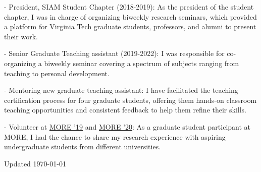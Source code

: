 \documentclass[11pt,letterpaper]{report}
\begin{document}
   \begin{tablist}
    \item[-] President, SIAM Student Chapter (2018-2019): As the president of the student chapter, I was in charge of organizing  biweekly
    research seminars, which provided a platform for Virginia Tech graduate students, professors, and alumni to present their work.

    \item[-] Senior Graduate Teaching assistant (2019-2022): I was responsible for co-organizing a biweekly seminar covering a spectrum of subjects ranging
    from teaching to personal development.

    \item[-] Mentoring new graduate teaching assistant: I have facilitated the teaching certification process for four graduate students, offering them hands-on classroom teaching opportunities and consistent feedback to help them refine their skills.

    \item[-] Volunteer at \href{http://intranet.math.vt.edu/MORE/}{MORE '19} and \href{https://intranet.math.vt.edu/MORE2020/}{MORE '20}: As a graduate student participant at MORE, I had the chance to share my research experience with aspiring undergraduate students from different universities. 
   \end{tablist}


    \begin{center}
        \vfill
        Updated \monthyeardate\today
    \end{center}
\end{document}
